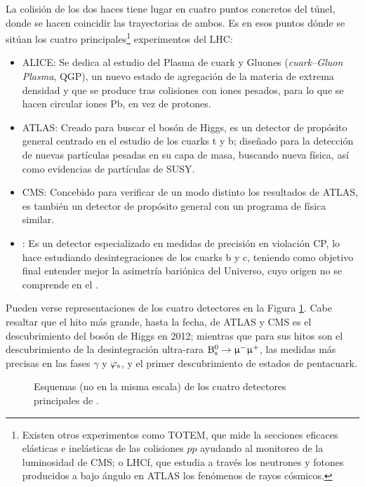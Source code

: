 La colisión de los dos haces tiene lugar en cuatro puntos  concretos del túnel, donde se hacen coincidir las trayectorias de ambos. 
Es en esos puntos dónde se sitúan los cuatro principales\footnote{Existen otros experimentos como TOTEM, que mide la secciones eficaces elásticas e inelásticas de las colisiones $pp$ ayudando al monitoreo de la luminosidad de CMS; o LHCf, que estudia a través los neutrones y fotones producidos a bajo ángulo en ATLAS los fenómenos de rayos cósmicos.} experimentos del LHC:

\begin{itemize}
 \item ALICE: Se dedica al estudio del Plasma de cuark y Gluones (\textit{cuark--Gluon Plasma}, QGP), un nuevo estado de agregación de la materia de extrema densidad y que se produce tras colisiones con iones pesados, para lo que se hacen circular iones Pb, en vez de protones.
 \item ATLAS: Creado para buscar el bosón de Higgs, es un detector de propósito general centrado en el estudio de los cuarks t y b; diseñado para la detección de nuevas partículas pesadas en su capa de masa, buscando nueva física, así como evidencias de partículas de SUSY.
 \item CMS: Concebido para verificar de un modo distinto los resultados de ATLAS, es también un detector de propósito general con un programa de física similar.
 \item \lhcb: Es un detector especializado en medidas de precisión en violación CP, lo hace estudiando desintegraciones de los cuarks b y c, teniendo como objetivo final entender mejor la asimetría bariónica del Universo, cuyo origen no se comprende en el \stdmod.
\end{itemize}

\color{vero}
Pueden verse representaciones de los cuatro detectores en la Figura \ref{fig_lhcdetect}. Cabe resaltar que el hito más grande, hasta la fecha, de ATLAS y CMS es el descubrimiento del bosón de Higgs en 2012; mientras que para \lhcb sus hitos son el descubrimiento de la desintegración ultra-rara $\text{B}{}_{\text{s}}^{\text{0}} \rightarrow \upmu{}^{-} \upmu{}^{+}$, las medidas más precisas en las fases $\gamma$ y $\varphi_{\text{s}}$, y el primer descubrimiento de estados de pentacuark.


\begin{figure}[H]
 \hfill
{} \hfill
%
 \hfill
{} \hfill
\caption{Esquemas (no en la misma escala) de los cuatro detectores principales de \lhc.} \label{fig_lhcdetect}
\end{figure}




